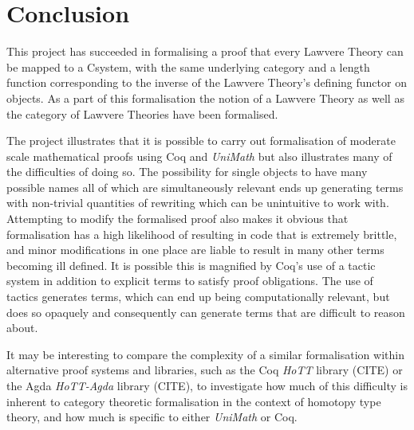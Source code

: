 \chapter{Conclusion}
This project has succeeded in formalising a proof that every Lawvere Theory can
be mapped to a Csystem, with the same underlying category and a length function
corresponding to the inverse of the Lawvere Theory's defining functor on
objects. As a part of this formalisation the notion of a Lawvere Theory as well
as the category of Lawvere Theories have been formalised.

The project illustrates that it is possible to carry out formalisation of
moderate scale mathematical proofs using Coq and \textit{UniMath} but also
illustrates many of the difficulties of doing so. The possibility for single
objects to have many possible names all of which are simultaneously relevant
ends up generating terms with non-trivial quantities of rewriting which can be
unintuitive to work with. Attempting to modify the formalised proof also makes
it obvious that formalisation has a high likelihood of resulting in code that is
extremely brittle, and minor modifications in one place are liable to result in
many other terms becoming ill defined. It is possible this is magnified by Coq's
use of a tactic system in addition to explicit terms to satisfy proof
obligations. The use of tactics generates terms, which can end up being
computationally relevant, but does so opaquely and consequently can generate
terms that are difficult to reason about.

It may be interesting to compare the complexity of a similar formalisation
within alternative proof systems and libraries, such as the Coq \textit{HoTT}
library (CITE) or the Agda \textit{HoTT-Agda} library (CITE), to investigate how
much of this difficulty is inherent to category theoretic formalisation in the
context of homotopy type theory, and how much is specific to either
\textit{UniMath} or Coq.